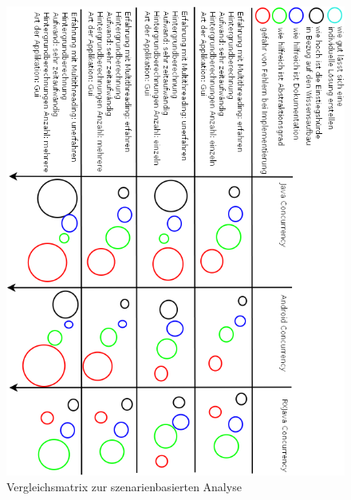 \documentclass[12pt,oneside,a4paper,bibtotoc,liststotoc]{scrreprt}
\begin{document}
\begin{figure}[H]
  \begin{centering}
    \includegraphics[width=1\textwidth]{img/szenarioBasedAnalysis.png}
    \caption{Vergleichsmatrix zur szenarienbasierten Analyse}
    \label{szenarioBasedAnalysis}
  \end{centering}
\end{figure}
\newpage
\end{document}

